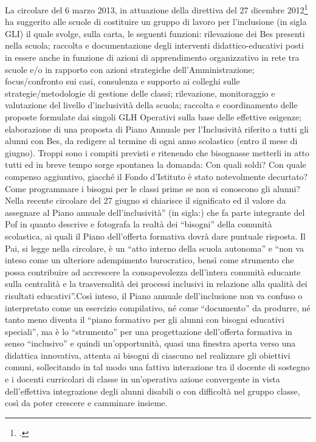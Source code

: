 La circolare del 6 marzo 2013, in attuazione della direttiva del 27 dicembre 2012\footcite{dir27Dic2012} ha suggerito alle scuole di costituire un gruppo di lavoro per l'inclusione (in sigla GLI) il quale svolge, sulla carta, le seguenti funzioni: rilevazione dei Bes presenti nella scuola; raccolta e documentazione degli interventi didattico-educativi posti in essere anche in funzione di azioni di apprendimento organizzativo in rete tra scuole e/o in rapporto con azioni strategiche dell'Amministrazione; focus/confronto sui casi, consulenza e supporto ai colleghi sulle strategie/metodologie di gestione delle classi; rilevazione, monitoraggio e valutazione del livello d'inclusività della scuola; raccolta e coordinamento delle proposte formulate dai singoli GLH Operativi sulla base delle effettive esigenze; elaborazione di una proposta di Piano Annuale per l'Inclusività riferito a tutti gli alunni con Bes, da redigere al termine di ogni anno scolastico (entro il mese di giugno).
Troppi sono i compiti previsti e ritenendo che bisognasse metterli in atto tutti ed in breve tempo sorge spontanea la domanda: Con quali soldi? Con quale compenso aggiuntivo, giacché il Fondo d'Istituto è stato notevolmente decurtato? Come programmare i bisogni per le classi prime se non si conoscono gli alunni?
Nella recente circolare del 27 giugno si chiarisce il significato ed il valore da assegnare al Piano annuale dell'inclusività” (in sigla:) che fa parte integrante del Pof in quanto descrive e fotografa la realtà dei “bisogni” della comunità scolastica, ai quali il Piano dell'offerta formativa dovrà dare puntuale risposta.
Il Pai, si legge nella circolare, è un “atto interno della scuola autonoma” e “non va inteso come un ulteriore adempimento burocratico, bensì come strumento che possa contribuire ad accrescere la consapevolezza dell'intera comunità educante sulla centralità e la trasversalità dei processi inclusivi in relazione alla qualità dei risultati educativi”.Così inteso, il Piano annuale dell'inclusione non va confuso o interpretato come un esercizio compilativo, né come “documento” da produrre, né tanto meno diventa il “piano formativo per gli alunni con bisogni educativi speciali”, ma è lo “strumento” per una progettazione dell'offerta formativa in senso “inclusivo” e quindi un'opportunità, quasi una finestra aperta verso una didattica innovativa, attenta ai bisogni di ciascuno nel realizzare gli obiettivi comuni, sollecitando in tal modo una fattiva interazione tra il docente di sostegno e i docenti curricolari di classe in un'operativa azione convergente in vista dell'effettiva integrazione degli alunni disabili o con difficoltà nel gruppo classe, così da poter crescere e camminare insieme.
